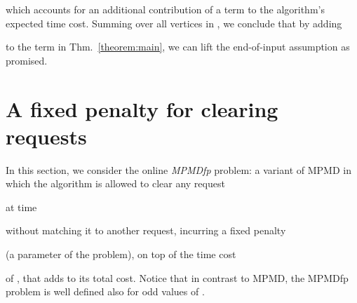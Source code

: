 \documentclass[11pt]{article}
\def\LongVersion{}
\def\LongVersionEnd{}
\theoremstyle{definition}
\theoremstyle{plain}
\theoremstyle{definition}
\theoremstyle{plain}
\theoremstyle{definition}
\theoremstyle{plain}
\newcommand{\Thm}{Thm.}
\begin{document}
which accounts for an additional contribution of a  term to the
algorithm's expected time cost.
Summing over all vertices in , we conclude that by adding

to the  term in \Thm{}~\ref{theorem:main}, we can lift the end-of-input
assumption as promised.
\LongVersionEnd 

\LongVersion \section{A fixed penalty for clearing requests}
\label{section:fixed-penalty}
In this section, we consider the online \emph{MPMDfp} problem:
a variant of MPMD in which the algorithm is allowed to clear any request

at time

without matching it to another request, incurring a fixed penalty

(a parameter of the problem), on top of the time cost

of ,
that adds to its total cost.
Notice that in contrast to MPMD, the MPMDfp problem is well defined also for
odd values of .
\end{document}
